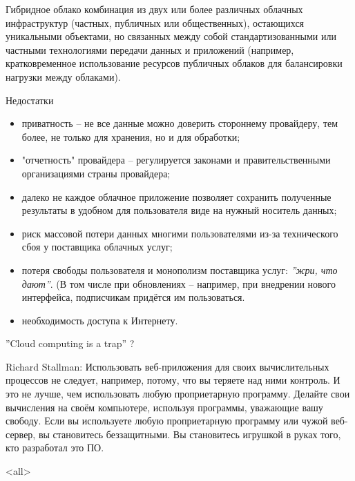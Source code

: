 \begin{frame}{Гибридное облако}
комбинация из двух или более различных облачных инфраструктур (частных,  публичных или общественных),  остающихся уникальными объектами,  но связанных между собой стандартизованными или частными технологиями передачи данных и приложений (например,  кратковременное использование ресурсов публичных облаков для балансировки нагрузки между облаками).
\end{frame}

\begin{frame}{Недостатки}
	\begin{itemize}
		\item приватность -- не все данные можно доверить стороннему провайдеру, тем более, не только для хранения, но и для обработки;
			\pause
		\item "отчетность" провайдера -- регулируется законами и правительственными организациями страны провайдера; 
			\pause
		\item далеко не каждое облачное приложение позволяет сохранить полученные результаты в удобном для пользователя виде на нужный носитель данных;
			\pause
		\item риск массовой потери данных многими пользователями из-за технического сбоя у поставщика облачных услуг;
			\pause
		\item потеря свободы пользователя и монополизм поставщика услуг: {\it ''жри, что дают''}.
			(В том числе при обновлениях -- например, при внедрении нового интерфейса, подписчикам придётся им пользоваться.
			\pause
		\item необходимость доступа к Интернету. 
	\end{itemize}
\end{frame}

\begin{frame}{''Cloud computing is a trap'' ?}
	\begin{block}{Richard Stallman:}
Использовать веб-приложения для своих вычислительных процессов не следует,  например,  потому,  что вы теряете над ними контроль. И это не лучше,  чем использовать любую проприетарную программу. Делайте свои вычисления на своём компьютере,  используя программы,  уважающие вашу свободу. Если вы используете любую проприетарную программу или чужой веб-сервер,  вы становитесь беззащитными. Вы становитесь игрушкой в руках того,  кто разработал это ПО.
	\end{block}
\end{frame}

\mode<all>{}


